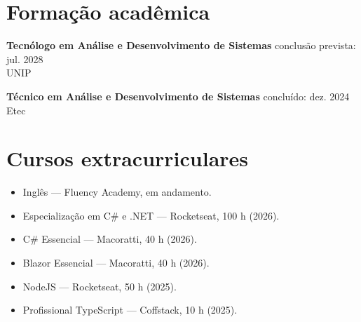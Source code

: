 \documentclass[11pt,a4paper]{article}
\begin{document}
\section*{Formação acadêmica}
\textbf{Tecnólogo em Análise e Desenvolvimento de Sistemas} \hfill conclusão prevista: jul. 2028\\
UNIP

\textbf{Técnico em Análise e Desenvolvimento de Sistemas} \hfill concluído: dez. 2024\\
Etec

\section*{Cursos extracurriculares}
\begin{itemize}
  \item Inglês --- Fluency Academy, em andamento.
  \item Especialização em C\# e .NET --- Rocketseat, 100 h (2026).
  \item C\# Essencial --- Macoratti, 40 h (2026).
  \item Blazor Essencial --- Macoratti, 40 h (2026).
  \item NodeJS --- Rocketseat, 50 h (2025).
  \item Profissional TypeScript --- Coffstack, 10 h (2025).
\end{itemize}
\end{document}
